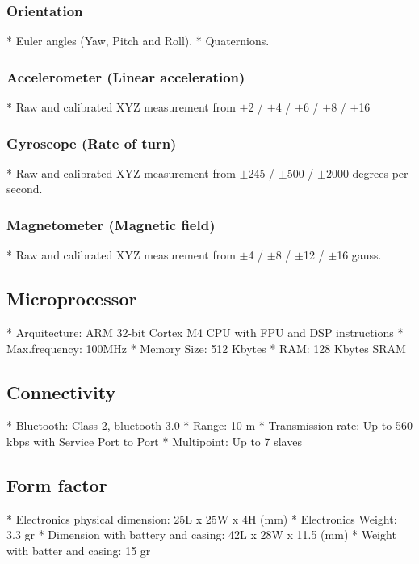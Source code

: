 \subsubsection*{Orientation}
* Euler angles (Yaw, Pitch and Roll).
* Quaternions.

\subsubsection*{Accelerometer (Linear acceleration)}
* Raw and calibrated XYZ measurement from $\pm$2 / $\pm$4 / $\pm$6 / $\pm$8  / $\pm$16

\subsubsection*{Gyroscope (Rate of turn)}
* Raw and calibrated XYZ measurement from $\pm$245 /  $\pm$500 / $\pm$2000 degrees per second.

\subsubsection*{Magnetometer (Magnetic field)}
* Raw and calibrated XYZ measurement from $\pm$4 / $\pm$8 / $\pm$12 / $\pm$16 gauss.


\subsection*{Microprocessor}
* Arquitecture: ARM 32-bit Cortex M4 CPU with FPU and DSP instructions
* Max.frequency: 100MHz
* Memory Size: 512 Kbytes
* RAM: 128 Kbytes SRAM


\subsection*{Connectivity}
* Bluetooth: Class 2, bluetooth 3.0
* Range: 10 m
* Transmission rate: Up to 560 kbps with Service Port to Port
* Multipoint: Up to 7 slaves


\subsection*{Form factor}
* Electronics physical dimension: 25L x 25W x 4H (mm)
* Electronics Weight: 3.3 gr
* Dimension with battery and casing: 42L x 28W x 11.5 (mm)
* Weight with batter and casing: 15 gr


